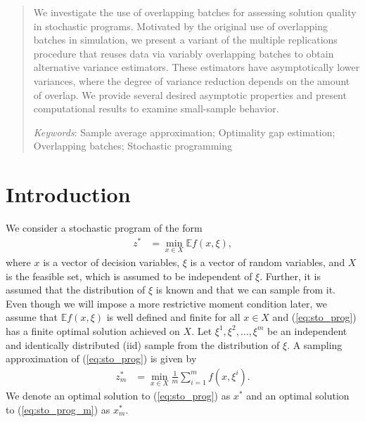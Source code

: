 \documentclass{article}
\newcommand{\e}[1]{\mathbb{E} %
#1 %
}
\newcommand{\x}{x} %
\newcommand{\xs}{\x^*}
\newcommand{\xit}{\xi}  %
\newcommand{\xiti}{\xit^i}
\newcommand{\Keywords}[1]{\par\noindent 
{\small{\em Keywords\/}: #1}}
\begin{document}
\begin{abstract}
We investigate the use of overlapping batches for assessing solution quality in stochastic programs. 
Motivated by the original use of overlapping batches in simulation, we present a variant of the multiple replications procedure that reuses data via variably overlapping batches to obtain alternative variance estimators.  
These estimators have asymptotically lower variances, where the degree of variance reduction depends on the amount of overlap.  
We provide several desired asymptotic properties and present computational results to examine small-sample behavior.\smallskip 
	
	\Keywords{Sample average approximation; Optimality gap estimation; Overlapping batches; Stochastic programming}
\end{abstract}

\section{Introduction}
\label{sec:intro}

We consider a stochastic program of the form
\begin{align} \tag{SP} \label{eq:sto_prog} 
	z^* & = \min_{\x \in X} \e{f(\x,\xit)},
\end{align}
where $\x$ is a vector of decision variables, $\xit$ is a vector of random variables, and $X$ is the feasible set, which is assumed to be independent of $\xit$.  
Further, it is assumed that the distribution of $\xit$ is known and that we can sample from it.  
Even though we will impose a more restrictive moment condition later, we assume that $\e{f(\x,\xit)}$ is well defined and finite for all $\x \in X$ and (\ref{eq:sto_prog}) has a finite optimal solution achieved on $X$.  
Let $\xit^1, \xit^2, \dots, \xit^m$ be an independent and identically distributed (iid) sample from the distribution of $\xit$.  
A sampling approximation of (\ref{eq:sto_prog}) is given by
\begin{align} \tag{SP$_m$} \label{eq:sto_prog_m}
	z_m^* & = \min_{\x \in X} \frac{1}{m} \sum_{i=1}^m f(\x,\xiti).
\end{align}
We denote an optimal solution to (\ref{eq:sto_prog}) as $\xs$ and an optimal solution to (\ref{eq:sto_prog_m}) as $\xs_m$.
\end{document}

